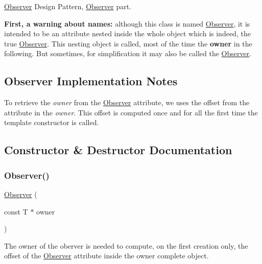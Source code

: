 \mbox{\hyperlink{classKatabatic_1_1Observer}{Observer}} Design Pattern, \mbox{\hyperlink{classKatabatic_1_1Observer}{Observer}} part. 

{\bfseries First, a warning about names\+:} although this class is named \mbox{\hyperlink{classKatabatic_1_1Observer}{Observer}}, it is intended to be an attribute nested inside the whole object which is indeed, the true \mbox{\hyperlink{classKatabatic_1_1Observer}{Observer}}. This nesting object is called, most of the time the {\bfseries owner} in the following. But sometimes, for simplification it may also be called the \mbox{\hyperlink{classKatabatic_1_1Observer}{Observer}}.\hypertarget{classKatabatic_1_1Observer_secImplObserver}{}\subsection{Observer Implementation Notes}\label{classKatabatic_1_1Observer_secImplObserver}
To retrieve the {\itshape owner} from the \mbox{\hyperlink{classKatabatic_1_1Observer}{Observer}} attribute, we uses the offset from the attribute in the {\itshape owner}. This offset is computed once and for all the first time the template constructor is called. 

\subsection{Constructor \& Destructor Documentation}
\mbox{\label{classKatabatic_1_1Observer_ab05ec12517c51952960dd4f324499b44}} 
\subsubsection{\texorpdfstring{Observer()}{Observer()}}
{\footnotesize\ttfamily \mbox{\hyperlink{classKatabatic_1_1Observer}{Observer}} (\begin{DoxyParamCaption}\item[{const T $\ast$}]{owner }\end{DoxyParamCaption})\hspace{0.3cm}{\ttfamily [inline]}}

The owner of the oberver is needed to compute, on the first creation only, the offset of the \mbox{\hyperlink{classKatabatic_1_1Observer}{Observer}} attribute inside the {\ttfamily owner} complete object. 

